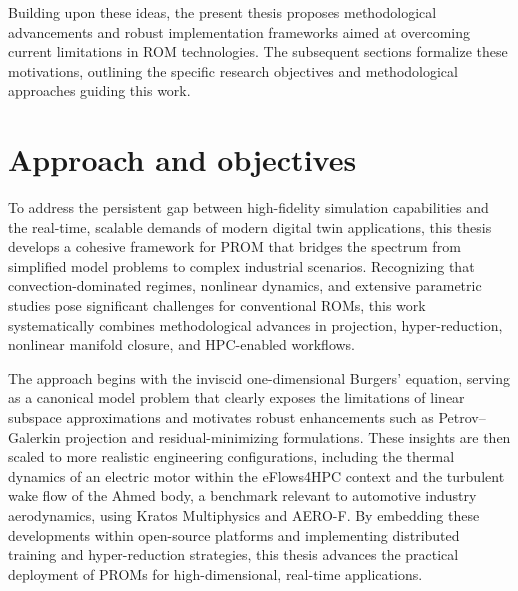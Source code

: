 Building upon these ideas, the present thesis proposes methodological advancements and robust implementation frameworks aimed at overcoming current limitations in ROM technologies. The subsequent sections formalize these motivations, outlining the specific research objectives and methodological approaches guiding this work.

\section{Approach and objectives}

To address the persistent gap between high-fidelity simulation capabilities and the real-time, scalable demands of modern digital twin applications, this thesis develops a cohesive framework for PROM that bridges the spectrum from simplified model problems to complex industrial scenarios. Recognizing that convection-dominated regimes, nonlinear dynamics, and extensive parametric studies pose significant challenges for conventional ROMs, this work systematically combines methodological advances in projection, hyper-reduction, nonlinear manifold closure, and HPC-enabled workflows.

The approach begins with the inviscid one-dimensional Burgers' equation, serving as a canonical model problem that clearly exposes the limitations of linear subspace approximations and motivates robust enhancements such as Petrov–Galerkin projection and residual-minimizing formulations. These insights are then scaled to more realistic engineering configurations, including the thermal dynamics of an electric motor within the eFlows4HPC context and the turbulent wake flow of the Ahmed body, a benchmark relevant to automotive industry aerodynamics, using Kratos Multiphysics and AERO-F. By embedding these developments within open-source platforms and implementing distributed training and hyper-reduction strategies, this thesis advances the practical deployment of PROMs for high-dimensional, real-time applications.

